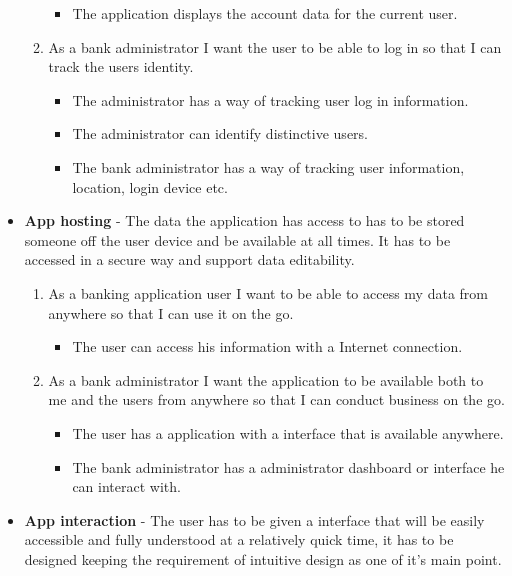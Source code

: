 \begin{itemize}
\begin{enumerate}
\begin{itemize}
                \item The application displays the account data for the current user.
            \end{itemize}
        \item As a bank administrator I want the user to be able to log in so that I can track the users identity.
            \begin{itemize}
                \item The administrator has a way of tracking user log in information.
                \item The administrator can identify distinctive users.
                \item The bank administrator has a way of tracking user information, location, login device etc.
            \end{itemize}
        \end{enumerate}
    \item  \textbf{App hosting} - The data the application has access to has to be stored someone off the user device and be available at all times. It has to be accessed in a secure way and support data editability.
        \begin{enumerate}
        \item As a banking application user I want to be able to access my data from anywhere so that I can use it on the go.
            \begin{itemize}
                \item The user can access his information with a Internet connection.
            \end{itemize}
        \item As a bank administrator I want the application to be available both to me and the users from anywhere so that I can conduct business on the go.
            \begin{itemize}
                \item The user has a application with a interface that is available anywhere.
                \item The bank administrator has a administrator dashboard or interface he can interact with.
            \end{itemize}
        \end{enumerate}
    \item  \textbf{App interaction} - The user has to be given a interface that will be easily accessible and fully understood at a relatively quick time, it has to be designed keeping the requirement of intuitive design as one of it's main point.

\end{itemize}
